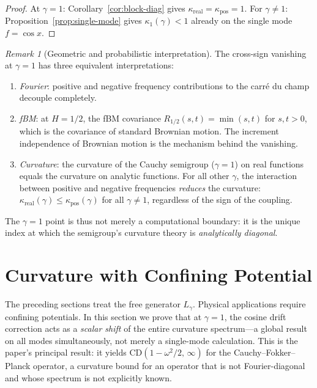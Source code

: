 \documentclass[11pt,a4paper]{article}
\theoremstyle{plain}
\theoremstyle{definition}
\theoremstyle{remark}
\newtheorem{remark}[theorem]{Remark}
\begin{document}
\begin{proof}
At $\gamma = 1$: Corollary~\ref{cor:block-diag} gives
$\kappa_{\mathrm{real}} = \kappa_{\mathrm{pos}} = 1$.
For $\gamma \neq 1$: Proposition~\ref{prop:single-mode} gives
$\kappa_1(\gamma) < 1$ already on the single mode $f = \cos x$.
\end{proof}

\begin{remark}[Geometric and probabilistic interpretation]
\label{rem:geometric}
The cross-sign vanishing at $\gamma = 1$ has three
equivalent interpretations:
\begin{enumerate}[label=(\alph*)]
\item \emph{Fourier}: positive and negative frequency
  contributions to the carr\'e du champ decouple
  completely.
\item \emph{fBM}: at $H = 1/2$, the fBM covariance
  $R_{1/2}(s,t) = \min(s,t)$ for $s,t > 0$, which is
  the covariance of standard Brownian motion.  The
  increment independence of Brownian motion is the
  mechanism behind the vanishing.
\item \emph{Curvature}: the curvature of the Cauchy
  semigroup ($\gamma = 1$) on real functions equals
  the curvature on analytic functions.  For all other
  $\gamma$, the interaction between positive and
  negative frequencies \emph{reduces} the curvature:
  $\kappa_{\mathrm{real}}(\gamma) \leq \kappa_{\mathrm{pos}}(\gamma)$
  for all $\gamma \neq 1$, regardless of the sign of the coupling.
\end{enumerate}
The $\gamma = 1$ point is thus not merely a
computational boundary: it is the unique index at
which the semigroup's curvature theory is
\emph{analytically diagonal}.
\end{remark}


\section{Curvature with Confining Potential}\label{sec:potential}

The preceding sections treat the free generator $L_\gamma$.
Physical applications require confining potentials.
In this section we prove that at $\gamma = 1$, the cosine
drift correction acts as a \emph{scalar shift} of the entire
curvature spectrum---a global result on all modes simultaneously,
not merely a single-mode calculation.
This is the paper's principal result: it yields
$\mathrm{CD}(1 - \omega^2/2,\,\infty)$ for the
Cauchy--Fokker--Planck operator, a curvature bound for
an operator that is not Fourier-diagonal and whose spectrum
is not explicitly known.
\end{document}

